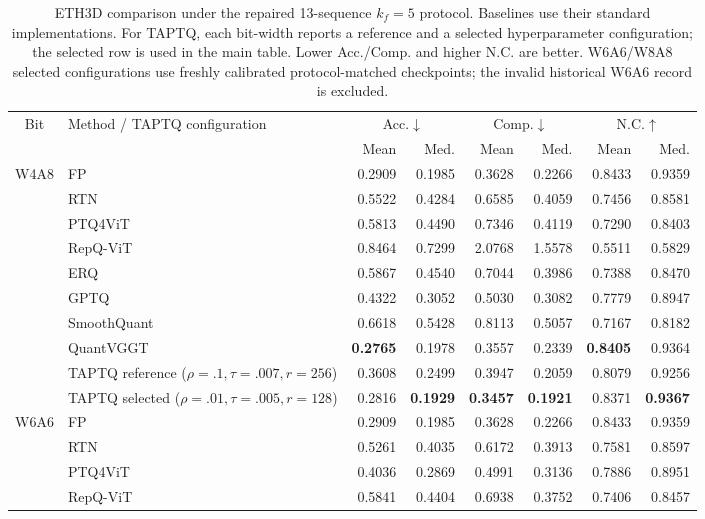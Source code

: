 \documentclass[journal]{Tail_Aware_Post_Training_Quantization_for_3D_Geometry_Models_TMM/IEEEtran}
\newcommand{\taptq}{\textsc{TAPTQ}}
\begin{document}
\begin{table}[t]
\caption{ETH3D comparison under the repaired 13-sequence $k_f=5$ protocol. Baselines use their standard implementations. For TAPTQ, each bit-width reports a reference and a selected hyperparameter configuration; the selected row is used in the main table. Lower Acc./Comp. and higher N.C. are better. W6A6/W8A8 selected configurations use freshly calibrated protocol-matched checkpoints; the invalid historical W6A6 record is excluded.}
\label{tab:eth3d_channelwise}
\centering
\scriptsize
\setlength{\tabcolsep}{4pt}
\begin{tabular}{clrrrrrr}
\toprule
Bit & Method / TAPTQ configuration & \multicolumn{2}{c}{Acc.$\downarrow$} & \multicolumn{2}{c}{Comp.$\downarrow$} & \multicolumn{2}{c}{N.C.$\uparrow$} \\
\cmidrule(lr){3-4}\cmidrule(lr){5-6}\cmidrule(lr){7-8}
& & Mean & Med. & Mean & Med. & Mean & Med. \\
\midrule
\multirow{10}{*}{W4A8}
& FP & 0.2909 & 0.1985 & 0.3628 & 0.2266 & 0.8433 & 0.9359 \\
& RTN & 0.5522 & 0.4284 & 0.6585 & 0.4059 & 0.7456 & 0.8581 \\
& PTQ4ViT & 0.5813 & 0.4490 & 0.7346 & 0.4119 & 0.7290 & 0.8403 \\
& RepQ-ViT & 0.8464 & 0.7299 & 2.0768 & 1.5578 & 0.5511 & 0.5829 \\
& ERQ & 0.5867 & 0.4540 & 0.7044 & 0.3986 & 0.7388 & 0.8470 \\
& GPTQ & 0.4322 & 0.3052 & 0.5030 & 0.3082 & 0.7779 & 0.8947 \\
& SmoothQuant & 0.6618 & 0.5428 & 0.8113 & 0.5057 & 0.7167 & 0.8182 \\
& QuantVGGT & \textbf{0.2765} & 0.1978 & 0.3557 & 0.2339 & \textbf{0.8405} & 0.9364 \\
\rowcolor{yellow!15}
& \taptq{} reference ($\rho=.1,\tau=.007,r=256$) & 0.3608 & 0.2499 & 0.3947 & 0.2059 & 0.8079 & 0.9256 \\
\rowcolor{yellow!15}
& \taptq{} selected ($\rho=.01,\tau=.005,r=128$) & 0.2816 & \textbf{0.1929} & \textbf{0.3457} & \textbf{0.1921} & 0.8371 & \textbf{0.9367} \\
\midrule
\multirow{10}{*}{W6A6}
& FP & 0.2909 & 0.1985 & 0.3628 & 0.2266 & 0.8433 & 0.9359 \\
& RTN & 0.5261 & 0.4035 & 0.6172 & 0.3913 & 0.7581 & 0.8597 \\
& PTQ4ViT & 0.4036 & 0.2869 & 0.4991 & 0.3136 & 0.7886 & 0.8951 \\
& RepQ-ViT & 0.5841 & 0.4404 & 0.6938 & 0.3752 & 0.7406 & 0.8457 \\

\end{tabular}
\end{table}
\end{document}
